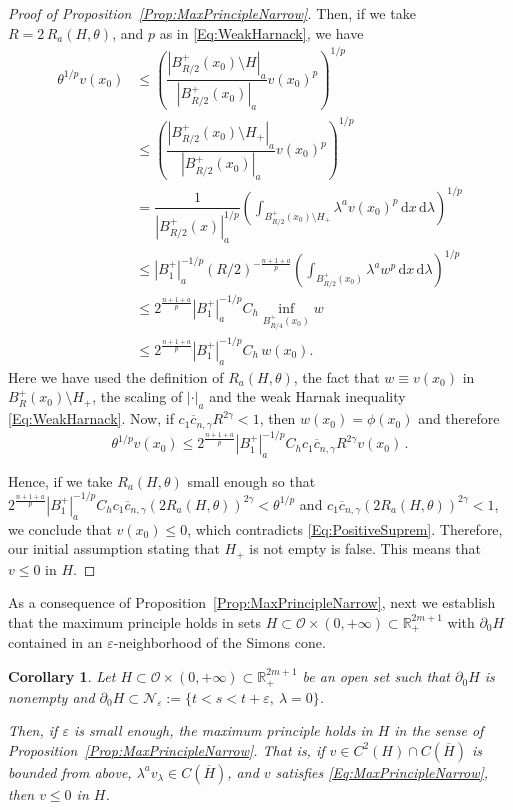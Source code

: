 \documentclass[12pt,reqno]{amsart}
\newtheorem{corollary}[theorem]{Corollary}
\theoremstyle{definition}
\theoremstyle{remark}
\newcommand{\con}[1]{\mathbb{#1}}
\newcommand{\R}{\con{R}} %
\newcommand{\ncal}{\mathcal{N}}
\newcommand{\ocal}{\mathcal{O}}
\newcommand{\s}{\gamma}
\renewcommand{\d}{\,\mathrm{d}} %
\numberwithin{equation}{section}
\begin{document}
\begin{proof}[Proof of Proposition~\ref{Prop:MaxPrincipleNarrow}]
Then, if we take $R = 2\,R_a( H,\theta)$, and $p$ as in \eqref{Eq:WeakHarnack}, we have
\begin{align*}
\theta^{1/p} v(x_0) & \leq \left (  \dfrac{|B^+_{R/2}(x_0)\setminus   H|_a}{|B^+_{R/2}(x_0)|_a}  v(x_0)^p \right)^{1/p} \\
& \leq \left (  \dfrac{|B^+_{R/2}(x_0)\setminus  H_+|_a}{|B^+_{R/2}(x_0)|_a}  v(x_0)^p \right)^{1/p} \\
&= \dfrac{1}{|B^+_{R/2}(x)|_a^{1/p}}  \left (  \int_{B^+_{R/2}(x_0)\setminus  H_+} \lambda ^a v(x_0)^p \d x \d \lambda  \right)^{1/p} \\
&\leq |B_1^+|_a^{-1/p} (R/2)^{- \frac{n+1+a}{p}} \left (  \int_{B^+_{R/2}(x_0)} \lambda ^a w^p \d x \d \lambda  \right)^{1/p} \\
&\leq 2^{\frac{n+1+a}{p}}|B_1^+|_a^{-1/p} C_h \inf_{B^+_{R/4}(x_0)} w \\
& \leq 2^{\frac{n+1+a}{p}}|B_1^+|_a^{-1/p} C_h \,  w(x_0).
\end{align*}
Here we have used the definition of $R_a( H,\theta)$, the fact that $w \equiv v(x_0)$ in $B^+_R(x_0)\setminus H_+$, the scaling of $|\cdot |_a$ and the weak Harnak inequality \eqref{Eq:WeakHarnack}. Now, if $c_1 \overline{c}_{n,\s} R^{2\s} < 1$, then $w(x_0) = \phi(x_0)$ and therefore
$$
\theta^{1/p} v(x_0) \leq  2^{\frac{n+1+a}{p}}|B_1^+|_a^{-1/p} C_h c_1 \overline{c}_{n,\s} R^{2\s} v(x_0)\,.
$$

Hence, if we take $R_a( H,\theta)$ small enough so that $ 2^{\frac{n+1+a}{p}} |B_1^+|_a^{-1/p} C_h c_1 \overline{c}_{n,\s} (2 R_a( H,\theta))^{2\s} < \theta^{1/p}$ and $c_1 \overline{c}_{n,\s} (2 R_a( H,\theta))^{2\s} < 1$, we conclude that $v(x_0) \leq 0$, which contradicts \eqref{Eq:PositiveSuprem}. Therefore, our initial assumption stating that $ H_+$ is not empty is false. This means that $v\leq 0$ in $H$.
\end{proof}

As a consequence of Proposition~\ref{Prop:MaxPrincipleNarrow}, next we establish that the maximum principle holds in sets $ H \subset \ocal \times (0, +\infty) \subset \R^{2m+1}_+$ with $\partial_0  H$ contained in an $\varepsilon$-neighborhood of the Simons cone.

\begin{corollary}
\label{Cor:MaxPrincipleNarrowSaddle}
Let $H\subset \ocal \times (0, +\infty) \subset \R^{2m + 1}_+$ be an open set such that $\partial_0 H$ is nonempty and $\partial_0 H \subset \ncal_\varepsilon := \{t < s < t+\varepsilon, \ \lambda= 0 \}$. 

Then, if $\varepsilon$ is small enough, the maximum principle holds in $H$ in the sense of Proposition~\ref{Prop:MaxPrincipleNarrow}. That is, if $v \in C^2 (H)\cap C(\overline{H})$ is bounded from above, $\lambda^a v_\lambda \in C (\overline{H})$, and $v$ satisfies \eqref{Eq:MaxPrincipleNarrow}, then $v\leq 0$ in $H$.
\end{corollary}
\end{document}
